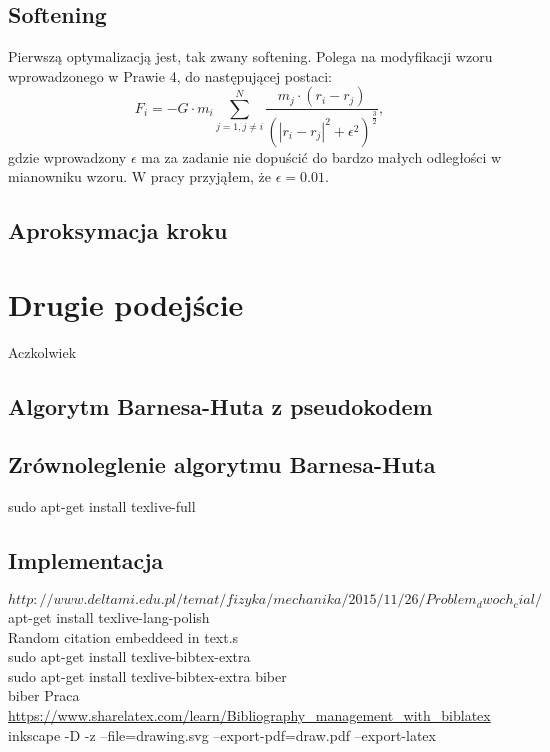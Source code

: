 \documentclass[14pt,twoside,a4paper]{article}
\begin{document}
\bigskip
\subsection{\Large Softening} 

Pierwszą optymalizacją jest, tak zwany softening. Polega na modyfikacji wzoru wprowadzonego w Prawie 4, do następującej postaci:
$$F_i = -G\cdot m_i \sum_{j=1, j\neq i}^N \frac{m_j\cdot (r_i - r_j)}{(|r_i - r_j|^2 + \epsilon^{2})^{\frac{3}{2}}},$$ 
gdzie wprowadzony $\epsilon$ ma za zadanie nie dopuścić do bardzo małych odległości w mianowniku wzoru. W pracy przyjąłem, że $\epsilon = 0.01$.

\bigskip
\subsection{\Large Aproksymacja kroku}

\bigskip

\section{\LARGE Drugie podejście}
Aczkolwiek 
\bigskip

\subsection{\Large Algorytm Barnesa-Huta z pseudokodem}

\bigskip

\subsection{\Large Zrównoleglenie algorytmu Barnesa-Huta}

\bigskip
 sudo apt-get install texlive-full

\subsection{\Large Implementacja}

$http://www.deltami.edu.pl/temat/fizyka/mechanika/2015/11/26/Problem_dwoch_cial/$
\bigskip
apt-get install texlive-lang-polish\\
Random citation embeddeed in text.s\\
 sudo apt-get install texlive-bibtex-extra\\
 sudo apt-get install texlive-bibtex-extra biber\\
biber Praca\\
\url{https://www.sharelatex.com/learn/Bibliography_management_with_biblatex}\\
inkscape -D -z --file=drawing.svg --export-pdf=draw.pdf --export-latex
\end{document}
